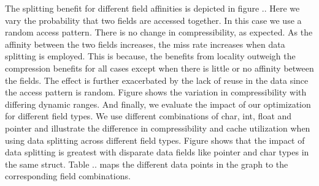 The splitting benefit for different field affinities is depicted in figure .. Here we vary the probability that two fields are accessed together. In this case we use a random access pattern. There is no change in compressibility, as expected. As the affinity between the two fields increases, the miss rate increases when data splitting is employed. This is because, the benefits from locality outweigh the compression benefits for all cases except when there is little or no affinity between the fields. The effect is further exacerbated by the lack of reuse in the data since the access pattern is random. Figure shows the variation in compressibility with differing dynamic ranges. And finally, we evaluate the impact of our optimization for different field types. We use different combinations of char, int, float and pointer and illustrate the difference in compressibility and cache utilization when using data splitting across different field types. Figure shows that the impact of data splitting is greatest with disparate data fields like pointer and char types in the same struct. Table .. maps the different data points in the graph to the corresponding field combinations. 
